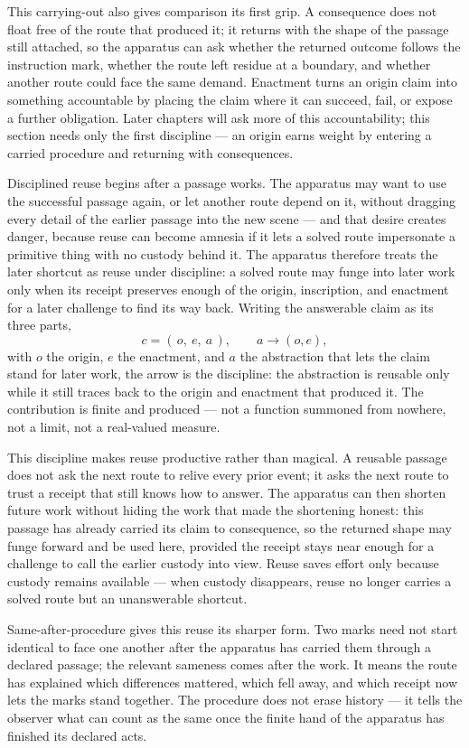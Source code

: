 This carrying-out also gives comparison its first grip. A consequence does not float free of the route that produced it; it returns with the shape of the passage still attached, so the apparatus can ask whether the returned outcome follows the instruction mark, whether the route left residue at a boundary, and whether another route could face the same demand. Enactment turns an origin claim into something accountable by placing the claim where it can succeed, fail, or expose a further obligation. Later chapters will ask more of this accountability; this section needs only the first discipline --- an origin earns weight by entering a carried procedure and returning with consequences.

Disciplined reuse begins after a passage works. The apparatus may want to use the successful passage again, or let another route depend on it, without dragging every detail of the earlier passage into the new scene --- and that desire creates danger, because reuse can become amnesia if it lets a solved route impersonate a primitive thing with no custody behind it. The apparatus therefore treats the later shortcut as reuse under discipline: a solved route may funge into later work only when its receipt preserves enough of the origin, inscription, and enactment for a later challenge to find its way back. Writing the answerable claim as its three parts,
\[ c = (\,o,\ e,\ a\,), \qquad a \longrightarrow (o, e), \]
with $o$ the origin, $e$ the enactment, and $a$ the abstraction that lets the claim stand for later work, the arrow is the discipline: the abstraction is reusable only while it still traces back to the origin and enactment that produced it. The contribution is finite and produced --- not a function summoned from nowhere, not a limit, not a real-valued measure.

This discipline makes reuse productive rather than magical. A reusable passage does not ask the next route to relive every prior event; it asks the next route to trust a receipt that still knows how to answer. The apparatus can then shorten future work without hiding the work that made the shortening honest: this passage has already carried its claim to consequence, so the returned shape may funge forward and be used here, provided the receipt stays near enough for a challenge to call the earlier custody into view. Reuse saves effort only because custody remains available --- when custody disappears, reuse no longer carries a solved route but an unanswerable shortcut.

Same-after-procedure gives this reuse its sharper form. Two marks need not start identical to face one another after the apparatus has carried them through a declared passage; the relevant sameness comes after the work. It means the route has explained which differences mattered, which fell away, and which receipt now lets the marks stand together. The procedure does not erase history --- it tells the observer what can count as the same once the finite hand of the apparatus has finished its declared acts.

